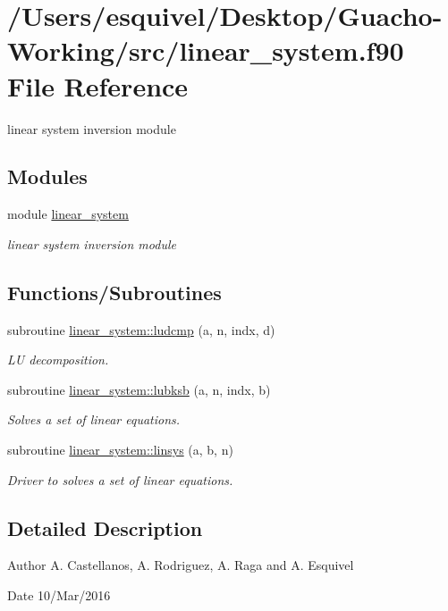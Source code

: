 \hypertarget{linear__system_8f90}{}\section{/\+Users/esquivel/\+Desktop/\+Guacho-\/\+Working/src/linear\+\_\+system.f90 File Reference}
\label{linear__system_8f90}


linear system inversion module  


\subsection*{Modules}
\begin{DoxyCompactItemize}
\item 
module \hyperlink{namespacelinear__system}{linear\+\_\+system}
\begin{DoxyCompactList}\small\item\em linear system inversion module \end{DoxyCompactList}\end{DoxyCompactItemize}
\subsection*{Functions/\+Subroutines}
\begin{DoxyCompactItemize}
\item 
subroutine \hyperlink{namespacelinear__system_ad77fb788295266bcc818f72d6677bf9d}{linear\+\_\+system\+::ludcmp} (a, n, indx, d)
\begin{DoxyCompactList}\small\item\em L\+U decomposition. \end{DoxyCompactList}\item 
subroutine \hyperlink{namespacelinear__system_acdd63cedefa6077e4100904703d6b82d}{linear\+\_\+system\+::lubksb} (a, n, indx, b)
\begin{DoxyCompactList}\small\item\em Solves a set of linear equations. \end{DoxyCompactList}\item 
subroutine \hyperlink{namespacelinear__system_a51e9428c30e00182fa86755204de7762}{linear\+\_\+system\+::linsys} (a, b, n)
\begin{DoxyCompactList}\small\item\em Driver to solves a set of linear equations. \end{DoxyCompactList}\end{DoxyCompactItemize}


\subsection{Detailed Description}
\begin{DoxyAuthor}{Author}
A. Castellanos, A. Rodriguez, A. Raga and A. Esquivel 
\end{DoxyAuthor}
\begin{DoxyDate}{Date}
10/\+Mar/2016 
\end{DoxyDate}
